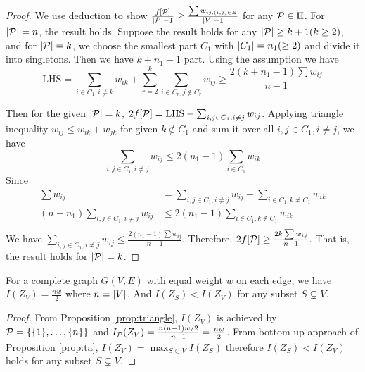 \documentclass{article}
\begin{document}

\begin{proof}


We use deduction to show  
$\frac{f[\P]}{\abs{\P}-1} \geq \frac{\sum w_{ij, (i,j) \in E}}{\abs{V}-1}$ for any $\P \in \Pi$. For $\abs{\P}=n$, the result holds. Suppose the result holds for any $\abs{\P} \geq k+1(k\geq 2)$, and for $\abs{\P}=k$, we choose the smallest part $C_1$ with $\abs{C_1}=n_1(\geq 2)$ and divide it into singletons. Then we have $k+n_1-1$ part. Using the assumption we have
$$
\mathrm{LHS} = \sum_{i\in C_1, i\neq k} w_{ik} + \sum_{r=2}^k \sum_{i \in C_r, j \not\in C_r} w_{ij}\geq \frac{2(k+n_1 -1)\sum w_{ij}}{n-1}
$$

Then for the given $\abs{\P}=k$, $2f[\P] =\mathrm{LHS} - \sum_{i,j\in C_1, i\neq j} w_{ij}$.
Applying triangle inequality $w_{ij} \leq w_{ik} + w_{jk}$ for given $k\not\in C_1$ and sum it over all $i, j \in C_1, i\neq j$, we have
$$
\sum_{i,j \in C_1, i\neq j} w_{ij} \leq 2(n_1-1)\sum_{i\in C_1} w_{ik}
$$
Since
\begin{align*}
\sum w_{ij} &= \sum_{i,j \in C_1, i\neq j} w_{ij} + \sum_{i\in C_1, k\neq C_1} w_{ik} \\
(n - n_1) \sum_{i,j \in C_1, i\neq j} w_{ij}& \leq 2(n_1 - 1) \sum_{i \in C_1, k \not\in C_1} w_{ik} \\
\end{align*}
We have $\sum_{i,j \in C_1, i\neq j} w_{ij} \leq \frac{2(n_1-1) \sum w_{ij}}{n-1}$. Therefore, 
$2f[\P] \geq \frac{2k \sum w_{ij}}{n-1}$. That is, the result holds for $\abs{\P}=k$.
\end{proof}
\begin{corollary}\label{cor:complete}
	For a complete graph $G(V,E)$ with equal weight $w$ on each edge, we have $I(Z_{V})=\frac{nw}{2}$ where $n=\abs{V}$. And $I(Z_S) < I(Z_V)$ for any subset $S\subsetneq V$.
\end{corollary}
\begin{proof}
From Proposition \ref{prop:triangle}, $I(Z_{V})$ is achieved by $\P=\{\{1\},\dots,\{n\} \}$ and $I_{\P}(Z_V) = \frac{n(n-1)w/2}{n-1} = \frac{nw}{2} $. From bottom-up approach of Proposition \ref{prop:ta}, $I(Z_V) = \max_{S\subset V} I(Z_S)$ therefore $I(Z_S) < I(Z_V)$ holds for any subset $S\subsetneq V$.
\end{proof}

\end{document}
